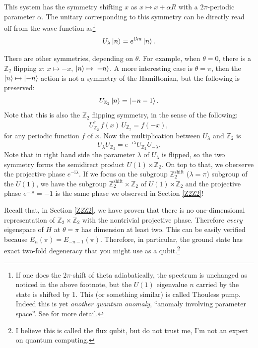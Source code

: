 \documentclass[
]{scrartcl}
\numberwithin{equation}{section}
\theoremstyle{definition}
\theoremstyle{definition}
\theoremstyle{definition}
\theoremstyle{definition}
\theoremstyle{remark}
\begin{document}
This system has the symmetry shifting \(x\) as \(x \mapsto x+ \alpha R\) with a \(2\pi\)-periodic parameter \(\alpha\).
The unitary corresponding to this symmetry can be directly read off from the wave function as\footnote{If one does the \(2\pi\)-shift of theta adiabatically, the spectrum is unchanged as noticed in the above footnote, but the \(U(1)\) eigenvalue \(n\) carried by the state is shifted by 1. This (or something similar) is called Thouless pump.
  Indeed this is yet \emph{another quantum anomaly}, ``anomaly involving parameter space''. See \textcite{Cordova:2019jnf} for more detail.}
\begin{equation}
  \label{eq:U1shift}
  U_\lambda \ket{n} = e^{\mathrm{i}\lambda n}\ket{n}.
\end{equation}

There are other symmetries, depending on \(\theta\).
For example, when \(\theta = 0\), there is a \(\mathbb{Z}_2\) flipping \(x\): \(x\mapsto -x\), \(\ket{n} \mapsto \ket{-n}\).
A more interesting case is \(\theta = \pi\), then the \(\ket{n} \mapsto \ket{-n}\) action is not a symmetry of the Hamiltonian, but the following is preserved:
\begin{equation}
  \label{eq:Z2ThetaPi}
  U_{\mathbb{Z}_2}\ket{n} = \ket{-n-1}.
\end{equation}
Note that this is also the \(\mathbb{Z}_2\) flipping symmetry, in the sense of the following:
\begin{equation}
  \label{eq:UxU}
  U_{\mathbb{Z}_2}^\dagger \, f(x) \, U_{\mathbb{Z}_2} = f(-x),
\end{equation}
for any periodic function \(f\) of \(x\).
Now the multiplication between \(U_\lambda\) and \(\mathbb{Z}_2\) is
\begin{equation}
  \label{eq:U1Z2comu}
  U_\lambda U_{\mathbb{Z}_2} = e^{-\mathrm{i}\lambda}U_{\mathbb{Z}_2}U_{-\lambda}.
\end{equation}
Note that in right hand side the parameter \(\lambda\) of \(U_{\lambda}\) is flipped, so the two symmetry forms the semidirect product \(U(1) \rtimes \mathbb{Z}_2\). On top to that, we oberserve the projective phase \(e^{-\mathrm{i}\lambda}\).
If we focus on the subgroup \(\mathbb{Z}_2^\text{shift}\) (\(\lambda = \pi\)) subgroup of the \(U(1)\), we have the subgroup \(\mathbb{Z}_2^\text{shift}\times \mathbb{Z}_2\) of \(U(1) \rtimes \mathbb{Z}_2\) and the projective phase \(e^{-\mathrm{i}\pi}=-1\) is the same phase we observed in Section \ref{Z2Z2}!

Recall that, in Section \ref{Z2Z2}, we have proven that there is no one-dimensional representation of \(\mathbb{Z}_2\times \mathbb{Z}_2\) with the nontrivial projective phase. Therefore \emph{every} eigenspace of \(H\) at \(\theta = \pi\) has dimension at least two. This can be easily verified because \(E_n(\pi) = E_{-n-1}(\pi)\). Therefore, in particular, the ground state has exact two-fold degeneracy that you might use as a qubit.\footnote{I believe this is called the flux qubit, but do not trust me, I'm not an expert on quantum computing.}
\end{document}
